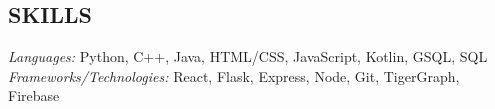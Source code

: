 \documentclass[11pt]{res}
\begin{document}
\begin{footnotesize}
\begin{resume}
\begin{small}
\section{SKILLS}
\end{small} 
\vspace{.5mm}
{\sl Languages:} 
Python, C++, Java, HTML/CSS, JavaScript, Kotlin, GSQL, SQL\\
{\sl Frameworks/Technologies:} React, Flask, Express, Node, Git, TigerGraph, Firebase

\end{resume}
\end{footnotesize}
\end{document}
